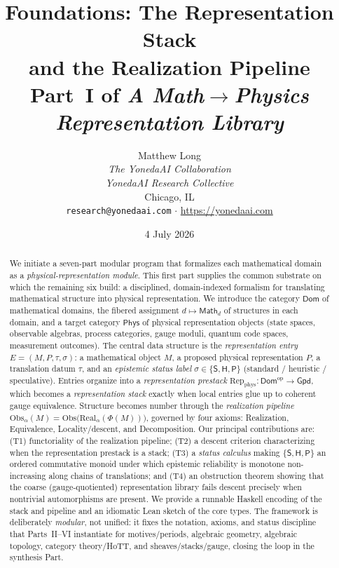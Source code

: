 \documentclass[12pt]{article}
\title{\textbf{Foundations: The Representation Stack\\ and the Realization Pipeline}\\[0.6em]
\large Part~I of \emph{A Math$\to$Physics Representation Library}}
\author{Matthew Long \\
\textit{The YonedaAI Collaboration} \\
\textit{YonedaAI Research Collective} \\
Chicago, IL \\
\texttt{research@yonedaai.com} $\cdot$ \url{https://yonedaai.com}}
\date{4 July 2026}
\theoremstyle{definition}
\theoremstyle{remark}
\newcommand{\Dom}{\mathsf{Dom}}
\newcommand{\Math}{\mathsf{Math}}
\newcommand{\Phys}{\mathsf{Phys}}
\newcommand{\Gpd}{\mathsf{Gpd}}
\newcommand{\Real}{\mathrm{Real}}
\newcommand{\Obs}{\mathrm{Obs}}
\newcommand{\Repphys}{\mathrm{Rep}_{\mathrm{phys}}}
\newcommand{\op}{\mathrm{op}}
\newcommand{\Sstat}{\mathsf{S}}
\newcommand{\Hstat}{\mathsf{H}}
\newcommand{\Pstat}{\mathsf{P}}
\begin{document}
\maketitle

\begin{abstract}
We initiate a seven-part modular program that formalizes each mathematical
domain as a \emph{physical-representation module}. This first part supplies the
common substrate on which the remaining six build: a disciplined, domain-indexed
formalism for translating mathematical structure into physical representation.
We introduce the category $\Dom$ of mathematical domains, the fibered assignment
$d \mapsto \Math_d$ of structures in each domain, and a target
category $\Phys$ of physical representation objects (state spaces, observable
algebras, process categories, gauge moduli, quantum code spaces, measurement
outcomes). The central data structure is the \emph{representation entry}
$E = (M,P,\tau,\sigma)$: a mathematical object $M$, a proposed physical
representation $P$, a translation datum $\tau$, and an
\emph{epistemic status label} $\sigma \in \{\Sstat,\Hstat,\Pstat\}$
(standard / heuristic / speculative). Entries organize into a
\emph{representation prestack} $\Repphys : \Dom^{\op} \to \Gpd$, which becomes a
\emph{representation stack} exactly when local entries glue up to coherent
gauge equivalence. Structure becomes number through the
\emph{realization pipeline}
$\Obs_\alpha(M) = \Obs\bigl(\Real_\alpha(\Phi(M))\bigr)$, governed by four
axioms: Realization, Equivalence, Locality/descent, and Decomposition. Our
principal contributions are: (T1) functoriality of the realization pipeline;
(T2) a descent criterion characterizing when the representation prestack is a
stack; (T3) a \emph{status calculus} making $\{\Sstat,\Hstat,\Pstat\}$ an ordered
commutative monoid under which epistemic reliability is monotone
non-increasing along chains of translations; and (T4) an obstruction theorem
showing that the coarse (gauge-quotiented) representation library fails descent
precisely when nontrivial automorphisms are present. We provide a runnable
Haskell encoding of the stack and pipeline and an idiomatic Lean sketch of the
core types. The framework is deliberately \emph{modular}, not unified: it fixes
the notation, axioms, and status discipline that Parts~II--VI instantiate for
motives/periods, algebraic geometry, algebraic topology, category theory/HoTT,
and sheaves/stacks/gauge, closing the loop in the synthesis Part.
\end{abstract}
\end{document}
